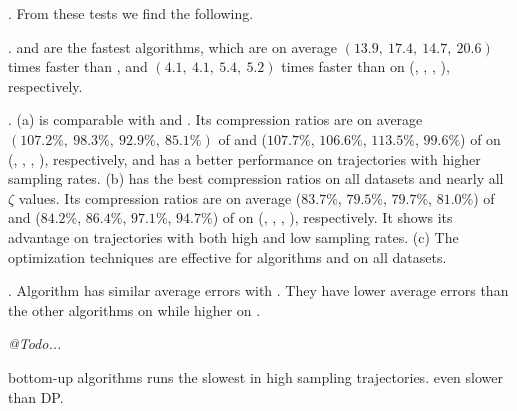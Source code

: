 .
From these tests we find the following.


\emph{}. \operb and \operba are the fastest algorithms, which are on average $(13.9, ~17.4, ~14.7, {~20.6})$ times faster than \dpa, and $(4.1,~4.1,~5.4, {~5.2})$
times faster than \fbqsa on (\taxi, \truck, \sercar, \geolife), respectively.

\emph{}. (a) \operb is comparable {with \fbqsa and \dpa}. Its compression ratios are on average $(107.2\%, ~98.3\%, ~92.9\%, ~85.1\%)$ of \fbqsa and ($107.7\%$, $106.6\%$, $113.5\%$, $99.6\%$) of \dpa on (\taxi, \truck, \sercar, \geolife), respectively, and \operb has a better performance on trajectories with higher sampling rates.
(b) \operba has the best compression ratios on all datasets and nearly all $\zeta$ values.
Its compression ratios are on average {($83.7\%$, $79.5\%$, $79.7\%$, $81.0\%$)} of \fbqsa and {($84.2\%$, $86.4\%$, $97.1\%$, $94.7\%$)} of \dpa on (\taxi, \truck, \sercar, \geolife), respectively.
It shows its advantage on trajectories with both high and low sampling rates.
(c) The optimization techniques are effective for algorithms \operb and \operba on all datasets.

\emph{}. {Algorithm \operb has similar average errors with \operba. They have lower average errors than the other algorithms on \taxi while higher on \sercar.}


\em
@Todo...

bottom-up algorithms runs the slowest in high sampling trajectories. even slower than DP.

\em




